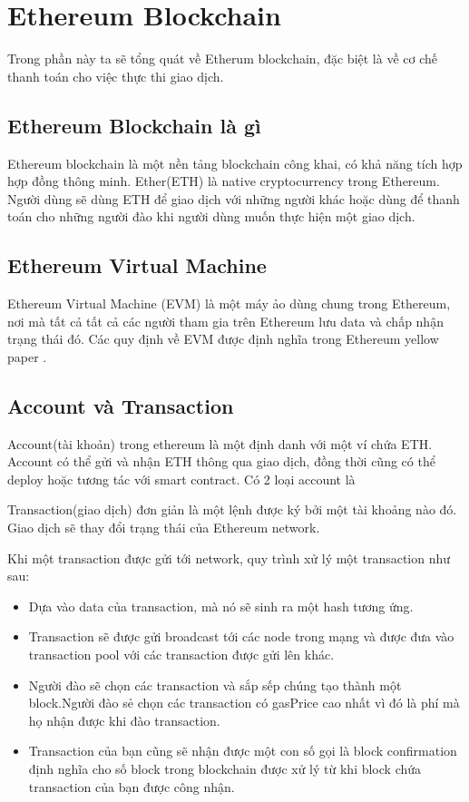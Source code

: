\documentclass[../thesis.tex]{subfiles}
\begin{document}
\section{Ethereum Blockchain}
Trong phần này ta sẽ tổng quát về Etherum blockchain, đặc biệt là về cơ chế thanh toán cho việc thực thi giao dịch.
\subsection{Ethereum Blockchain là gì}
Ethereum blockchain là một nền tảng blockchain công khai, có khả năng tích hợp hợp đồng thông minh. Ether(ETH) là native cryptocurrency trong Ethereum. Người dùng sẽ dùng ETH để giao dịch với những người khác hoặc dùng để thanh toán cho những người đào khi người dùng muốn thực hiện một giao dịch.

\subsection{Ethereum Virtual Machine}
Ethereum Virtual Machine (EVM) là một máy ảo dùng chung trong Ethereum, nơi mà tất cả tất cả các người tham gia trên Ethereum lưu data và chấp nhận trạng thái đó. Các quy định về EVM được định nghĩa trong Ethereum yellow paper \cite{yellowpaper}.
\subsection{Account và Transaction}

Account(tài khoản) trong ethereum là một định danh với một ví chứa ETH. Account có thể gửi và nhận ETH thông qua giao dịch, đồng thời cũng có thể deploy hoặc tương tác với smart contract. Có 2 loại account là 

Transaction(giao dịch) đơn giản là một lệnh được ký bởi một tài khoảng nào đó. Giao dịch sẽ thay đổi trạng thái của Ethereum network.

Khi một transaction được gửi tới network, quy trình xử lý một transaction như sau: 

\begin{itemize}
  \item Dựa vào data của transaction, mà nó sẽ sinh ra một hash tương ứng.
  \item Transaction sẽ được gửi broadcast tới các node trong mạng và được đưa vào transaction pool với các transaction được gửi lên khác. 
  \item Người đào sẽ chọn các transaction và sắp sếp chúng tạo thành một block.Người đào sẻ chọn các transaction có gasPrice cao nhất vì đó là phí mà họ nhận được khi đào transaction.
  \item Transaction của bạn cũng sẽ nhận được một con số gọi là block confirmation định nghĩa cho số block trong blockchain được xử lý từ khi block chứa transaction của bạn được công nhận.
\end{itemize}
\end{document}
